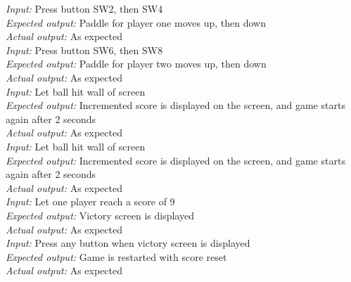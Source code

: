 \emph{Input: } Press button SW2, then SW4\\
\emph{Expected output: } Paddle for player one moves up, then down\\
\emph{Actual output: } As expected \\

\emph{Input: } Press button SW6, then SW8\\
\emph{Expected output: } Paddle for player two moves up, then down\\
\emph{Actual output: } As expected \\

\emph{Input: } Let ball hit wall of screen\\
\emph{Expected output: } Incremented score is displayed on the screen, and game starts again after 2 seconds\\
\emph{Actual output: } As expected \\


\emph{Input: } Let ball hit wall of screen\\
\emph{Expected output: } Incremented score is displayed on the screen, and game starts again after 2 seconds\\
\emph{Actual output: } As expected \\

\emph{Input: } Let one player reach a score of 9\\
\emph{Expected output: } Victory screen is displayed\\
\emph{Actual output: } As expected \\

\emph{Input: } Press any button when victory screen is displayed\\
\emph{Expected output: } Game is restarted with score reset\\
\emph{Actual output: } As expected \\